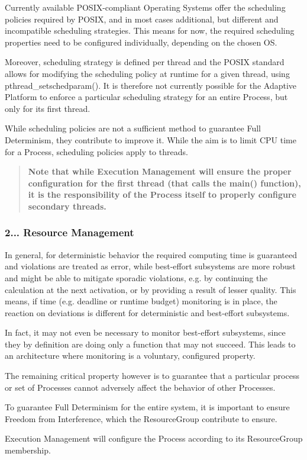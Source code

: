 \begin{DoxyItemize}
\item Currently available P\+O\+S\+I\+X-\/compliant Operating Systems offer the scheduling policies required by P\+O\+S\+IX, and in most cases additional, but different and incompatible scheduling strategies. This means for now, the required scheduling properties need to be configured individually, depending on the chosen OS.
\item Moreover, scheduling strategy is defined per thread and the P\+O\+S\+IX standard allows for modifying the scheduling policy at runtime for a given thread, using pthread\+\_\+setschedparam(). It is therefore not currently possible for the Adaptive Platform to enforce a particular scheduling strategy for an entire Process, but only for its first thread.
\item While scheduling policies are not a sufficient method to guarantee Full Determinism, they contribute to improve it. While the aim is to limit C\+PU time for a Process, scheduling policies apply to threads. \begin{quote}
{\bfseries Note that while Execution Management will ensure the proper configuration for the first thread (that calls the main() function), it is the responsibility of the Process itself to properly configure secondary threads.} \end{quote}

\end{DoxyItemize}

\subsubsection*{2... {\bfseries Resource Management}}


\begin{DoxyItemize}
\item In general, for deterministic behavior the required computing time is guaranteed and violations are treated as error, while best-\/effort subsystems are more robust and might be able to mitigate sporadic violations, e.\+g. by continuing the calculation at the next activation, or by providing a result of lesser quality. This means, if time (e.\+g. deadline or runtime budget) monitoring is in place, the reaction on deviations is different for deterministic and best-\/effort subsystems.
\item In fact, it may not even be necessary to monitor best-\/effort subsystems, since they by definition are doing only a function that may not succeed. This leads to an architecture where monitoring is a voluntary, configured property.
\item The remaining critical property however is to guarantee that a particular process or set of Processes cannot adversely affect the behavior of other Processes.
\item To guarantee Full Determinism for the entire system, it is important to ensure Freedom from Interference, which the Resource\+Group contribute to ensure.
\item Execution Management will configure the Process according to its Resource\+Group membership.
\end{DoxyItemize}

